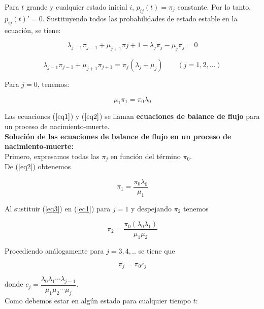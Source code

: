 Para $t$ grande y cualquier estado inicial $i$, $p_{ij}(t)=\pi_{j}$ constante. Por lo tanto, $p_{ij}(t)'=0$. Sustituyendo todos las probabilidades de estado estable en la ecuación, se tiene:

\begin{equation*}
\lambda_{j-1} \pi_{j-1} + \mu_{j+1}  \pi{j+1} - \lambda_j  \pi_{j} - \mu_{j} \pi_{j}=0
\end{equation*}

\begin{equation}
\lambda_{j-1} \pi_{j-1} + \mu_{j+1}  \pi_{j+1} = \pi_j(\lambda_j + \mu_j) \qquad (j= 1,2,...) \label{eq1}
\end{equation}


Para $j=0$, tenemos:

\begin{equation}
\mu_1 \pi_1 = \pi_0 \lambda_0
\label{eq2}
\end{equation}

Las ecuaciones ($\ref{eq1}$) y ($\ref{eq2}$) se llaman \textbf{ecuaciones de balance de flujo} para un proceso de nacimiento-muerte.\\

\textbf{Solución de las ecuaciones de balance de flujo en un proceso de nacimiento-muerte:}\\

Primero, expresamos todas las $\pi_j$ en función del término $\pi_0$.\\

De (\ref{eq2}) obtenemos

\begin{equation}
\pi_1=\frac{\pi_0 \lambda_0}{\mu_1}
\label{eq3}
\end{equation}

Al sustituir (\ref{eq3}) en (\ref{eq1}) para $j=1$ y despejando $\pi_2$ tenemos

\begin{equation}
\pi_2=\frac{\pi_0(\lambda_0 \lambda_1)}{\mu_1 \mu_2}
\label{eq4}
\end{equation}

Procediendo análogamente para $j=3,4,..$ se tiene que

\begin{equation}
\pi_j=\pi_0 c_j
\label{eq5}
\end{equation}

donde $c_j=\dfrac{\lambda_0 \lambda_1 \cdots \lambda_{j-1}}{\mu_1 \mu_2 \cdots \mu_j}$.\\

Como debemos estar en algún estado para cualquier tiempo $t$:

